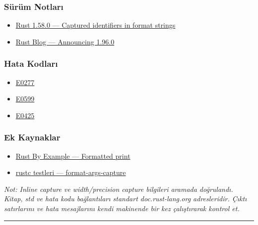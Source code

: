 \documentclass[12pt,a4paper]{article}
\begin{document}
\subsubsection{Sürüm Notları}\label{sürüm-notları-1}

\begin{itemize}
\tightlist
\item
  \href{https://blog.rust-lang.org/2022/01/13/Rust-1.58.0.html}{Rust 1.58.0 --- Captured identifiers in format strings}
\item
  \href{https://blog.rust-lang.org/2026/05/28/Rust-1.96.0/}{Rust Blog --- Announcing 1.96.0}
\end{itemize}

\subsubsection{Hata Kodları}\label{hata-kodları-1}

\begin{itemize}
\tightlist
\item
  \href{https://doc.rust-lang.org/error_codes/E0277.html}{E0277}
\item
  \href{https://doc.rust-lang.org/error_codes/E0599.html}{E0599}
\item
  \href{https://doc.rust-lang.org/error_codes/E0425.html}{E0425}
\end{itemize}

\subsubsection{Ek Kaynaklar}\label{ek-kaynaklar-1}

\begin{itemize}
\tightlist
\item
  \href{https://doc.rust-lang.org/rust-by-example/hello/print.html}{Rust By Example --- Formatted print}
\item
  \href{https://rust.googlesource.com/rust/+/HEAD/tests/ui/fmt/format-args-capture.rs}{rustc testleri --- format-args-capture}
\end{itemize}

\emph{Not: Inline capture ve width/precision capture bilgileri aramada doğrulandı. Kitap, std ve hata kodu bağlantıları standart doc.rust-lang.org adresleridir. Çıktı satırlarını ve hata mesajlarını kendi makinende bir kez çalıştırarak kontrol et.}

\begin{center}\rule{0.5\linewidth}{0.5pt}\end{center}
\end{document}
